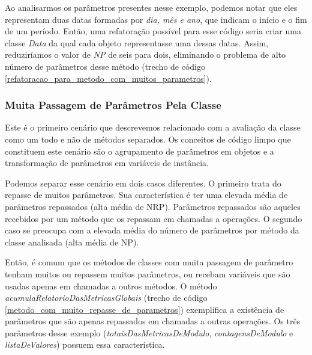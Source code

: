                    
                                                                                                        
Ao analisarmos os parâmetros presentes nesse exemplo, podemos notar que eles representam duas datas formadas por \textit{dia, mês e ano}, que indicam o início e o fim de um período. Então, uma refatoração possível para esse código seria criar uma classe \textit{Data} da qual cada objeto representasse uma dessas datas. Assim, reduziríamos o valor de \textit{NP} de seis para dois, eliminando o problema de alto número de parâmetros desse método (trecho de código \ref{refatoracao_para_metodo_com_muitos_parametros}). 
                                                                               
          
              

\subsubsection{Muita Passagem de Parâmetros Pela Classe}
	
Este é o primeiro cenário que descrevemos relacionado com a avaliação da classe como um todo e não de métodos separados. Os conceitos de código limpo que constituem este cenário são o agrupamento de parâmetros em objetos e a transformação de parâmetros em variáveis de instância.
	
Podemos separar esse cenário em dois casos diferentes. O primeiro trata do repasse de muitos parâmetros. Sua característica é ter uma elevada média de parâmetros repassados (alta média de NRP). Parâmetros repassados são aqueles recebidos por um método que os repassam em chamadas a operações. O segundo caso se preocupa com a elevada média do número de parâmetros por método da classe analisada (alta média de NP).       
		     
Então, é comum que os métodos de classes com muita passagem de parâmetro tenham muitos ou repassem muitos parâmetros, ou recebam variáveis que são usadas apenas em chamadas a outros métodos.	O método \textit{acumulaRelatorioDasMetricasGlobais} (trecho de código \ref{metodo_com_muito_repasse_de_parametros}) exemplifica a existência de parâmetros que são apenas repassados em chamadas a outras operações. Os três parâmetros desse exemplo (\textit{totaisDasMetricasDeModulo}, \textit{contagensDeModulo} e \textit{listaDeValores}) possuem essa característica. 
	                                                               
